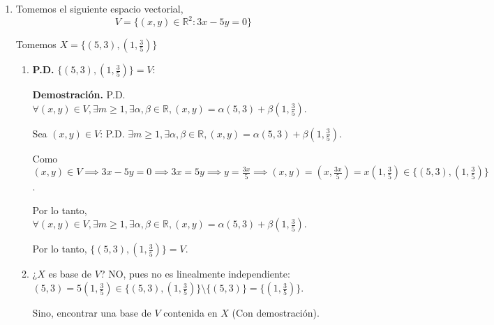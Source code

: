\begin{enumerate}
    \item Tomemos el siguiente espacio vectorial, $$V = \{(x, y) \in \mathbb{R}^2 : 3x - 5y = 0\}$$ 
    
    Tomemos $X = \{(5, 3), (1, \frac{3}{5})\}$
    
   
    \begin{enumerate}
        \item \textbf{P.D.} $\{(5, 3), (1, \frac{3}{5})\} = V$: 
        
        \textbf{Demostración.}
        P.D. $\forall (x, y) \in V, \exists m \geq 1, \exists \alpha, \beta \in \mathbb{R}, (x, y) = \alpha(5, 3) + \beta(1, \frac{3}{5})$.
        
        Sea $(x, y) \in V$:
        P.D. $\exists m \geq 1, \exists \alpha, \beta \in \mathbb{R}, (x, y) = \alpha(5, 3) + \beta(1, \frac{3}{5})$.
        
        Como $(x, y) \in V \implies 3x - 5y = 0 \implies 3x = 5y \implies y = \frac{3x}{5} \implies (x, y) = (x, \frac{3x}{5}) = x(1, \frac{3}{5}) \in \{(5, 3), (1, \frac{3}{5})\}$.
        
        Por lo tanto, $\forall (x, y) \in V, \exists m \geq 1, \exists \alpha, \beta \in \mathbb{R}, (x, y) = \alpha(5, 3) + \beta(1, \frac{3}{5})$.
        
        Por lo tanto, $\{(5, 3), (1, \frac{3}{5})\} = V$.
        
        \item ¿$X$ es base de $V$? 
        NO, pues no es linealmente independiente: $(5, 3) = 5(1, \frac{3}{5}) \in \{(5, 3), (1, \frac{3}{5})\} \setminus \{(5, 3)\} = \{(1, \frac{3}{5})\}$.
        
        Sino, encontrar una base de $V$ contenida en $X$ (Con demostración).
        

\end{enumerate}
\end{enumerate}
